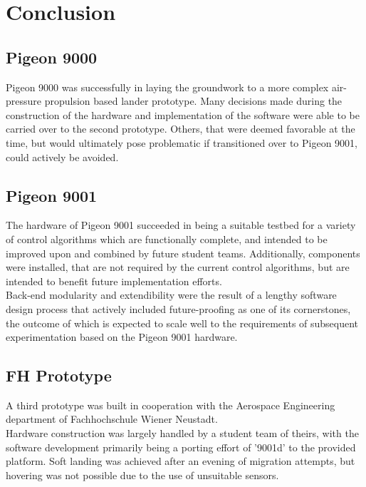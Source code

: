 \chapter{Conclusion}
\section{Pigeon 9000}
Pigeon 9000 was successfully in laying the groundwork to a more complex air-pressure propulsion based lander prototype. Many decisions made during the construction of the hardware and implementation of the software were able to be carried over to the second prototype. Others, that were deemed favorable at the time, but would ultimately pose problematic if transitioned over to Pigeon 9001, could actively be avoided.

\section{Pigeon 9001}
The hardware of Pigeon 9001 succeeded in being a suitable testbed for a variety of control algorithms which are functionally complete, and intended to be improved upon and combined by future student teams. Additionally, components were installed, that are not required by the current control algorithms, but are intended to benefit future implementation efforts. \\

Back-end modularity and extendibility were the result of a lengthy software design process that actively included future-proofing as one of its cornerstones, the outcome of which is expected to scale well to the requirements of subsequent experimentation based on the Pigeon 9001 hardware.


\section{FH Prototype}
A third prototype was built in cooperation with the Aerospace Engineering department of Fachhochschule Wiener Neustadt. \\

Hardware construction was largely handled by a student team of theirs, with the software development primarily being a porting effort of '9001d' to the provided platform. 
Soft landing was achieved after an evening of migration attempts, but hovering was not possible due to the use of unsuitable sensors. 
